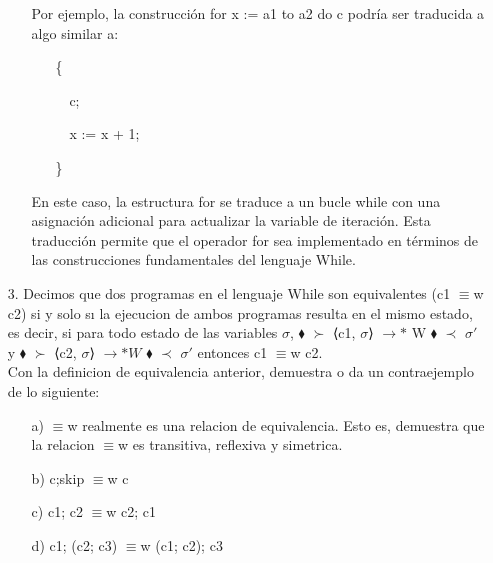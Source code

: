 \documentclass{article}
\begin{document}
\begin{itemize}
\begin{itemize}
            Por ejemplo, la construcción for x := a1 to a2 do c podría ser traducida a algo similar a:

            \begin{itemize}
                \item[ ]    \{
                \item[ ] \, \,       c;
                \item[ ] \, \,       x := x + 1;
                \item[ ]    \}
            \end{itemize}

            En este caso, la estructura for se traduce a un bucle while con una asignación adicional para actualizar la variable de iteración. Esta traducción permite que el operador for sea implementado en términos de las construcciones fundamentales del lenguaje While. 
        \end{itemize}

        \item[3.] Decimos que dos programas en el lenguaje While son equivalentes (c1 $\equiv$w c2) si y solo sı la ejecucion de ambos programas resulta en el mismo estado, es decir, si para todo estado de las variables $\sigma$, $\blacklozenge$ $\succ$  ⟨c1, $\sigma$⟩ $\rightarrow{*}$ W $\blacklozenge$ $\prec$ $\sigma'$ y $\blacklozenge$ $\succ$ ⟨c2, $\sigma$⟩ $\longrightarrow*W$ $\blacklozenge$ $\prec$ $\sigma'$ entonces c1 $\equiv$w c2.\\
        Con la definicion de equivalencia anterior, demuestra o da un contraejemplo de lo siguiente:
        \begin{itemize}
            \item[a)] $\equiv$w realmente es una relacion de equivalencia. Esto es, demuestra que la relacion $\equiv$w es transitiva, reflexiva y simetrica.
            \item[b)] c;skip $\equiv$w c
            \item[c)] c1; c2 $\equiv$w c2; c1
            \item[d)] c1; (c2; c3) $\equiv$w (c1; c2); c3 
        \end{itemize}
    \end{itemize}
\end{document}
